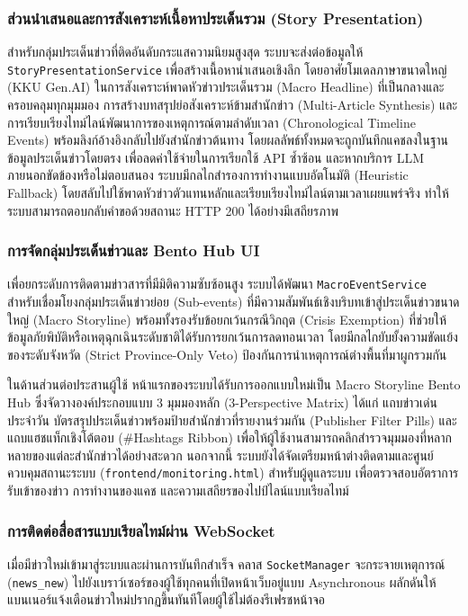 \subsubsection{ส่วนนำเสนอและการสังเคราะห์เนื้อหาประเด็นรวม (Story Presentation)}
สำหรับกลุ่มประเด็นข่าวที่ติดอันดับกระแสความนิยมสูงสุด ระบบจะส่งต่อข้อมูลให้ \texttt{StoryPresentationService} เพื่อสร้างเนื้อหานำเสนอเชิงลึก โดยอาศัยโมเดลภาษาขนาดใหญ่ (KKU Gen.AI) ในการสังเคราะห์พาดหัวข่าวประเด็นรวม (Macro Headline) ที่เป็นกลางและครอบคลุมทุกมุมมอง การสร้างบทสรุปย่อสังเคราะห์ข้ามสำนักข่าว (Multi-Article Synthesis) และการเรียบเรียงไทม์ไลน์พัฒนาการของเหตุการณ์ตามลำดับเวลา (Chronological Timeline Events) พร้อมลิงก์อ้างอิงกลับไปยังสำนักข่าวต้นทาง โดยผลลัพธ์ทั้งหมดจะถูกบันทึกแคชลงในฐานข้อมูลประเด็นข่าวโดยตรง เพื่อลดค่าใช้จ่ายในการเรียกใช้ API ซ้ำซ้อน และหากบริการ LLM ภายนอกขัดข้องหรือไม่ตอบสนอง ระบบมีกลไกสำรองการทำงานแบบอัตโนมัติ (Heuristic Fallback) โดยสลับไปใช้พาดหัวข่าวตัวแทนหลักและเรียบเรียงไทม์ไลน์ตามเวลาเผยแพร่จริง ทำให้ระบบสามารถตอบกลับคำขอด้วยสถานะ HTTP 200 ได้อย่างมีเสถียรภาพ

\subsubsection{การจัดกลุ่มประเด็นข่าวและ Bento Hub UI}
เพื่อยกระดับการติดตามข่าวสารที่มีมิติความซับซ้อนสูง ระบบได้พัฒนา \texttt{MacroEventService} สำหรับเชื่อมโยงกลุ่มประเด็นข่าวย่อย (Sub-events) ที่มีความสัมพันธ์เชิงบริบทเข้าสู่ประเด็นข่าวขนาดใหญ่ (Macro Storyline) พร้อมทั้งรองรับข้อยกเว้นกรณีวิกฤต (Crisis Exemption) ที่ช่วยให้ข้อมูลภัยพิบัติหรือเหตุฉุกเฉินระดับชาติได้รับการยกเว้นการลดทอนเวลา โดยมีกลไกยับยั้งความขัดแย้งของระดับจังหวัด (Strict Province-Only Veto) ป้องกันการนำเหตุการณ์ต่างพื้นที่มาผูกรวมกัน

ในด้านส่วนต่อประสานผู้ใช้ หน้าแรกของระบบได้รับการออกแบบใหม่เป็น Macro Storyline Bento Hub ซึ่งจัดวางองค์ประกอบแบบ 3 มุมมองหลัก (3-Perspective Matrix) ได้แก่ แถบข่าวเด่นประจำวัน บัตรสรุปประเด็นข่าวพร้อมป้ายสำนักข่าวที่รายงานร่วมกัน (Publisher Filter Pills) และแถบแฮชแท็กเชิงโต้ตอบ (\#Hashtags Ribbon) เพื่อให้ผู้ใช้งานสามารถคลิกสำรวจมุมมองที่หลากหลายของแต่ละสำนักข่าวได้อย่างสะดวก นอกจากนี้ ระบบยังได้จัดเตรียมหน้าต่างติดตามและศูนย์ควบคุมสถานะระบบ (\texttt{frontend/monitoring.html}) สำหรับผู้ดูแลระบบ เพื่อตรวจสอบอัตราการรับเข้าของข่าว การทำงานของแคช และความเสถียรของไปป์ไลน์แบบเรียลไทม์

\subsubsection{การติดต่อสื่อสารแบบเรียลไทม์ผ่าน WebSocket}
เมื่อมีข่าวใหม่เข้ามาสู่ระบบและผ่านการบันทึกสำเร็จ คลาส \texttt{SocketManager} จะกระจายเหตุการณ์ (\texttt{news\_new}) ไปยังเบราว์เซอร์ของผู้ใช้ทุกคนที่เปิดหน้าเว็บอยู่แบบ Asynchronous ผลักดันให้แบนเนอร์แจ้งเตือนข่าวใหม่ปรากฏขึ้นทันทีโดยผู้ใช้ไม่ต้องรีเฟรชหน้าจอ

